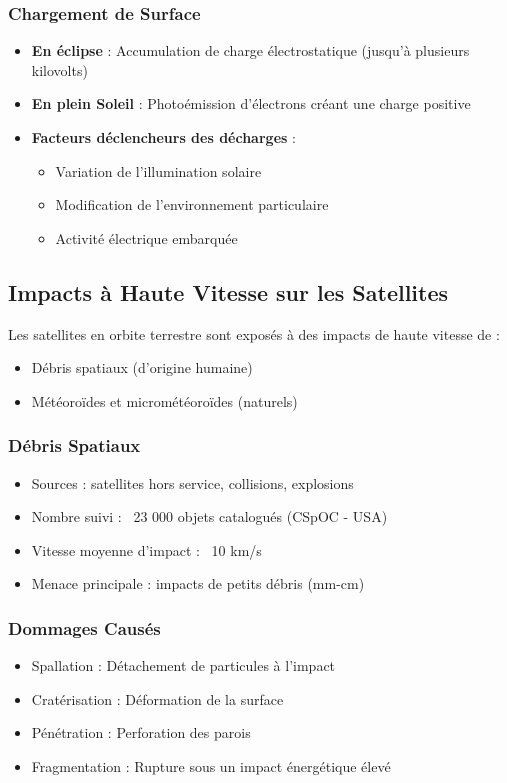 \subsubsection{Chargement de Surface}
\begin{itemize}
    \item \textbf{En éclipse} : Accumulation de charge électrostatique (jusqu’à plusieurs kilovolts)
    \item \textbf{En plein Soleil} : Photoémission d’électrons créant une charge positive
    \item \textbf{Facteurs déclencheurs des décharges} :
    \begin{itemize}
        \item Variation de l’illumination solaire
        \item Modification de l’environnement particulaire
        \item Activité électrique embarquée
    \end{itemize}
\end{itemize}

\subsection{Impacts à Haute Vitesse sur les Satellites}
Les satellites en orbite terrestre sont exposés à des impacts de haute vitesse de :
\begin{itemize}
    \item Débris spatiaux (d’origine humaine)
    \item Météoroïdes et micrométéoroïdes (naturels)
\end{itemize}

\subsubsection{Débris Spatiaux}
\begin{itemize}
    \item Sources : satellites hors service, collisions, explosions
    \item Nombre suivi : ~23 000 objets catalogués (CSpOC - USA)
    \item Vitesse moyenne d’impact : ~10 km/s
    \item Menace principale : impacts de petits débris (mm-cm)
\end{itemize}

\subsubsection{Dommages Causés}
\begin{itemize}
    \item Spallation : Détachement de particules à l’impact
    \item Cratérisation : Déformation de la surface
    \item Pénétration : Perforation des parois
    \item Fragmentation : Rupture sous un impact énergétique élevé
\end{itemize}

